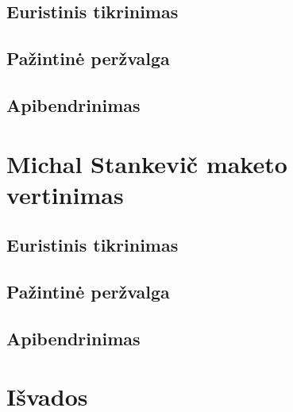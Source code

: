 \documentclass[oneside]{VUMIFPSkursinis}
\begin{document}
\subsection{Euristinis tikrinimas}
\subsection{Pažintinė peržvalga}
\subsection{Apibendrinimas}
\section{Michal Stankevič maketo vertinimas}
\subsection{Euristinis tikrinimas}
\subsection{Pažintinė peržvalga}
\subsection{Apibendrinimas}
\section{Išvados}
\end{document}
